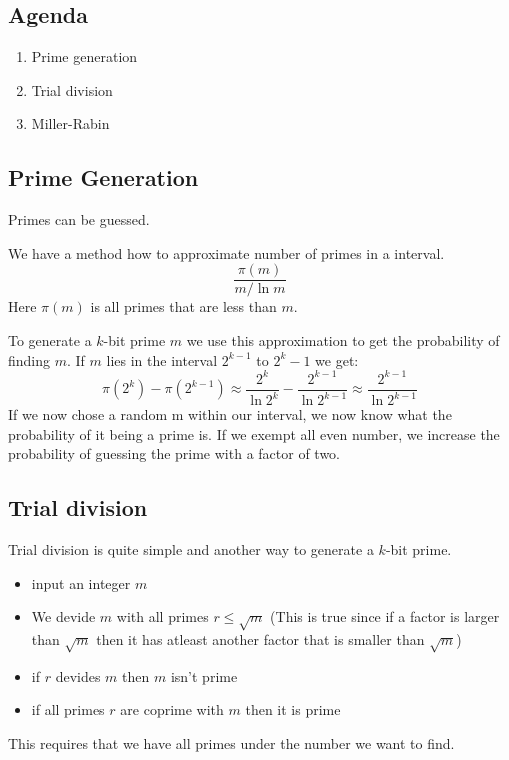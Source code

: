 

\subsection*{Agenda}
\begin{enumerate}
\item Prime generation
\item Trial division
\item Miller-Rabin
\end{enumerate}

\subsection{Prime Generation}
Primes can be guessed.

We have a method how to approximate number of primes in a interval.
\[ \frac{\pi (m)}{m/\ln m} \]
Here $\pi (m)$ is all primes that are less than $m$.

To generate a $k$-bit prime $m$ we use this approximation to get the
probability of finding $m$. If $m$ lies in the interval $2^{k-1}$ to
$2^k-1$ we get:
\[
\pi (2^k)-\pi (2^{k-1}) \approx
\frac{2^k}{\ln 2^k}-\frac{2^{k-1}}{\ln 2^{k-1}}
\approx \frac{2^{k-1}}{\ln 2^{k-1}}
\]
If we now chose a random m within our interval, we now know what the
probability of it being a prime is. If we exempt all even number, we
increase the probability of guessing the prime with a factor of two.

\subsection{Trial division}
Trial division is quite simple and another way to generate a $k$-bit
prime.
\begin{itemize}
\item input an integer $m$
\item We devide $m$ with all primes $r\le \sqrt{m}$ (This is true since
  if a factor is larger than $\sqrt{m}$ then it has atleast another
  factor that is smaller than $\sqrt{m}$)
\item if $r$ devides $m$ then $m$ isn't prime
\item if all primes $r$ are coprime with $m$ then it is prime
\end{itemize}
This requires that we have all primes under the number we want to find.

